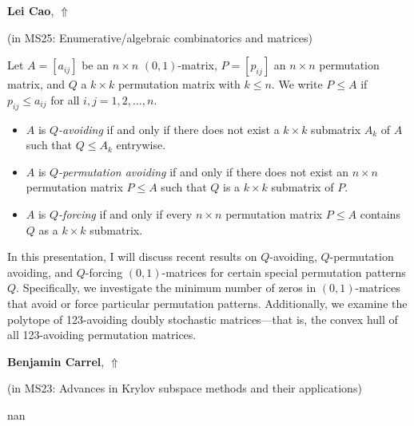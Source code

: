 \documentclass[ILAS2025-program.tex]{subfiles}
\begin{document}
     \hypertarget{down0369}{}\begin{ilasabstract}
    
    \textbf{Lei Cao},  \hfill \hyperlink{up0369}{$\Uparrow$}
    
    (in {\color{mstitle}MS25: Enumerative/algebraic combinatorics and matrices})
        
        \mtskip
    Let $A = [a_{ij}]$ be an $n \times n$ $(0,1)$-matrix, $P = [p_{ij}]$ an $n \times n$ permutation matrix, and $Q$ a $k \times k$ permutation matrix with $k \leq n$. We write $P \leq A$ if $p_{ij} \leq a_{ij}$ for all $i, j = 1, 2, \ldots, n$.

\begin{itemize}
    \item $A$ is \emph{$Q$-avoiding} if and only if there does not exist a $k \times k$ submatrix $A_k$ of $A$ such that $Q \leq A_k$ entrywise.

    \item $A$ is \emph{$Q$-permutation avoiding} if and only if there does not exist an $n \times n$ permutation matrix $P \leq A$ such that $Q$ is a $k \times k$ submatrix of $P$.

    \item $A$ is \emph{$Q$-forcing} if and only if every $n \times n$ permutation matrix $P \leq A$ contains $Q$ as a $k \times k$ submatrix.
\end{itemize}



In this presentation, I will discuss recent results on $Q$-avoiding, $Q$-permutation avoiding, and $Q$-forcing $(0,1)$-matrices for certain special permutation patterns $Q$. Specifically, we investigate the minimum number of zeros in $(0,1)$-matrices that avoid or force particular permutation patterns. Additionally, we examine the polytope of 123-avoiding doubly stochastic matrices—that is, the convex hull of all 123-avoiding permutation matrices.
\end{ilasabstract}
     \hypertarget{down0393}{}\begin{ilasabstract}
    
    \textbf{Benjamin Carrel},  \hfill \hyperlink{up0393}{$\Uparrow$}
    
    (in {\color{mstitle}MS23: Advances in Krylov subspace methods and their applications})
        
        \mtskip
    nan\end{ilasabstract}
\end{document}
